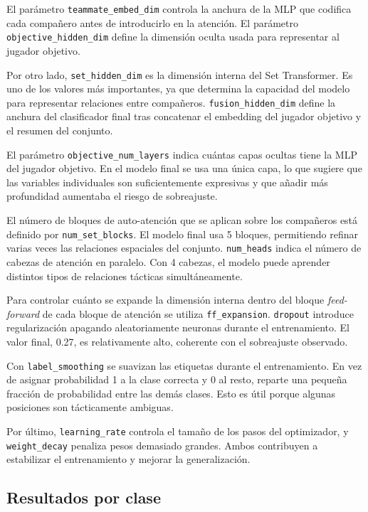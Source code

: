 El parámetro \texttt{teammate\_embed\_dim} controla la anchura de la MLP que codifica cada compañero antes de introducirlo en la atención. El parámetro \texttt{objective\_hidden\_dim} define la dimensión oculta usada para representar al jugador objetivo.

Por otro lado, \texttt{set\_hidden\_dim} es la dimensión interna del Set Transformer. Es uno de los valores más importantes, ya que determina la capacidad del modelo para representar relaciones entre compañeros. \texttt{fusion\_hidden\_dim} define la anchura del clasificador final tras concatenar el embedding del jugador objetivo y el resumen del conjunto.

El parámetro \texttt{objective\_num\_layers} indica cuántas capas ocultas tiene la MLP del jugador objetivo. En el modelo final se usa una única capa, lo que sugiere que las variables individuales son suficientemente expresivas y que añadir más profundidad aumentaba el riesgo de sobreajuste.

El número de bloques de auto-atención que se aplican sobre los compañeros está definido por \texttt{num\_set\_blocks}. El modelo final usa 5 bloques, permitiendo refinar varias veces las relaciones espaciales del conjunto. \texttt{num\_heads} indica el número de cabezas de atención en paralelo. Con 4 cabezas, el modelo puede aprender distintos tipos de relaciones tácticas simultáneamente.

Para controlar cuánto se expande la dimensión interna dentro del bloque \textit{feed-forward} de cada bloque de atención se utiliza \texttt{ff\_expansion}. \texttt{dropout} introduce regularización apagando aleatoriamente neuronas durante el entrenamiento. El valor final, 0.27, es relativamente alto, coherente con el sobreajuste observado.

Con \texttt{label\_smoothing} se suavizan las etiquetas durante el entrenamiento. En vez de asignar probabilidad 1 a la clase correcta y 0 al resto, reparte una pequeña fracción de probabilidad entre las demás clases. Esto es útil porque algunas posiciones son tácticamente ambiguas.

Por último, \texttt{learning\_rate} controla el tamaño de los pasos del optimizador, y \texttt{weight\_decay} penaliza pesos demasiado grandes. Ambos contribuyen a estabilizar el entrenamiento y mejorar la generalización.

\subsection{Resultados por clase}
\label{subsec:resultados-clase-posicional}

